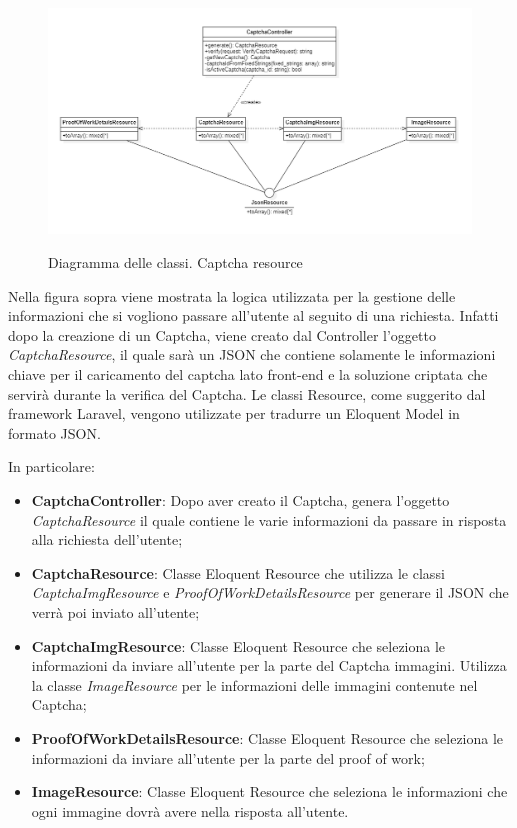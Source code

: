 \begin{figure}[H]
	\centering
	\includegraphics[scale = 0.6]{img/captcha_resource.png}\\
	\caption{Diagramma delle classi. Captcha resource}
\end{figure}

Nella figura sopra viene mostrata la logica utilizzata per la gestione delle informazioni che si vogliono passare all'utente al seguito di una richiesta. Infatti dopo la creazione di un Captcha, viene creato dal Controller l'oggetto \textit{CaptchaResource}, il quale sarà un JSON che contiene solamente le informazioni chiave per il caricamento del captcha lato front-end e la soluzione criptata che servirà durante la verifica del Captcha. Le classi Resource, come suggerito dal framework Laravel, vengono utilizzate per tradurre un Eloquent Model in formato JSON.

In particolare:
\begin{itemize}
	\item \textbf{CaptchaController}: Dopo aver creato il Captcha, genera l'oggetto \textit{CaptchaResource} il quale contiene le varie informazioni da passare in risposta alla richiesta dell'utente;
	\item \textbf{CaptchaResource}: Classe Eloquent Resource che utilizza le classi \textit{CaptchaImgResource} e \textit{ProofOfWorkDetailsResource} per generare il JSON che verrà poi inviato all'utente;
	\item \textbf{CaptchaImgResource}: Classe Eloquent Resource che seleziona le informazioni da inviare all'utente per la parte del Captcha immagini. Utilizza la classe \textit{ImageResource} per le informazioni delle immagini contenute nel Captcha;
	\item \textbf{ProofOfWorkDetailsResource}: Classe Eloquent Resource che seleziona le informazioni da inviare all'utente per la parte del proof of work;
	\item \textbf{ImageResource}: Classe Eloquent Resource che seleziona le informazioni che ogni immagine dovrà avere nella risposta all'utente.
\end{itemize}
\newpage

